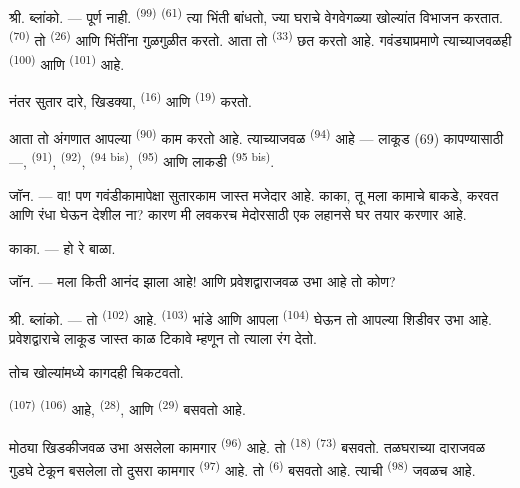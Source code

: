 श्री. \textsc{ब्लांको}. --- पूर्ण नाही.  \textsuperscript{(99)}
 \textsuperscript{(61)} त्या भिंती बांधतो, ज्या घराचे वेगवेगळ्या खोल्यांत
विभाजन करतात.  \textsuperscript{(70)} तो 
\textsuperscript{(26)} आणि भिंतींना गुळगुळीत करतो. आता तो 
\textsuperscript{(33)} छत करतो आहे. गवंड्याप्रमाणे त्याच्याजवळही 
\textsuperscript{(100)} आणि  \textsuperscript{(101)} आहे.

नंतर सुतार दारे, खिडक्या,  \textsuperscript{(16)} आणि 
\textsuperscript{(19)} करतो.

आता तो अंगणात आपल्या  \textsuperscript{(90)} काम करतो आहे.
त्याच्याजवळ  \textsuperscript{(94)} आहे — लाकूड (69) कापण्यासाठी —, 
\textsuperscript{(91)},  \textsuperscript{(92)}, 
\textsuperscript{(94 bis)},  \textsuperscript{(95)} आणि लाकडी 
\textsuperscript{(95 bis)}.

\textsc{जॉन}. --- वा! पण गवंडीकामापेक्षा सुतारकाम जास्त मजेदार आहे. काका, तू मला कामाचे बाकडे,
करवत आणि रंधा घेऊन देशील ना? कारण मी लवकरच मेदोरसाठी एक लहानसे घर तयार करणार आहे.

\textsc{काका}. --- हो रे बाळा.

\textsc{जॉन}. --- मला किती आनंद झाला आहे! आणि प्रवेशद्वाराजवळ उभा आहे तो कोण?

\VUsaut{3.0mm}
\VUsaut{3.0mm}

श्री. \textsc{ब्लांको}. --- तो  \textsuperscript{(102)} आहे. 
\textsuperscript{(103)} भांडे आणि आपला  \textsuperscript{(104)} घेऊन तो आपल्या
शिडीवर उभा आहे. प्रवेशद्वाराचे लाकूड जास्त काळ टिकावे म्हणून तो त्याला रंग देतो.

तोच खोल्यांमध्ये कागदही चिकटवतो.

 \textsuperscript{(107)}  \textsuperscript{(106)} आहे,  \textsuperscript{(28)}, आणि  \textsuperscript{(29)} बसवतो आहे.

मोठ्या खिडकीजवळ उभा असलेला कामगार  \textsuperscript{(96)} आहे. तो
 \textsuperscript{(18)}  \textsuperscript{(73)} बसवतो.
तळघराच्या दाराजवळ गुडघे टेकून बसलेला तो दुसरा कामगार 
\textsuperscript{(97)} आहे. तो  \textsuperscript{(6)} बसवतो आहे. त्याची
 \textsuperscript{(98)} जवळच आहे.

